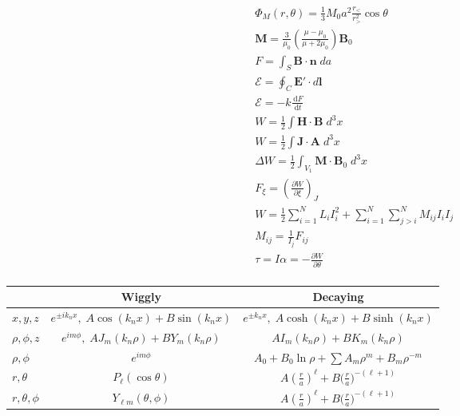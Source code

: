 \documentclass[10pt]{article}
\newcommand{\vect}[1]{\boldsymbol{\mathbf{#1}}}
\newcommand{\dd}{\, \mathrm{d}}
\newcommand{\tder}[2]{\frac{\dd #1}{\dd #2}}
\newcommand{\pder}[2]{\frac{\partial #1}{\partial #2}}
\begin{document}
\begin{multicols}{2}
\begin{align*}
		& \Phi_M(r,\theta) = \frac{1}{3} M_0 a^2 \frac{r_<}{r_>^2} \cos \theta \tag*{Uniformly magnetized sphere (5.104)} \\
		& \vect{M} = \frac{3}{\mu_0} \left( \frac{\mu - \mu_0}{\mu + 2 \mu_0} \right) \vect{B}_0 \tag*{Sphere in uniform field (5.115)} \\
		& F = \int_S \vect{B \cdot n} \; da \tag*{Magnetic flux (5.133)} \\
		& \mathscr{E} = \oint_C \vect{E}' \cdot d \vect{l} \tag*{Electromotive force (5.134)} \\
		& \mathscr{E} = -k \tder{F}{t} \tag*{Faraday's Law (5.135)} \\
		& W = \frac{1}{2} \int \vect{H \cdot B} \; d^3 x \tag*{Total magnetic energy (5.148)} \\
		& W = \frac{1}{2} \int \vect{J \cdot A} \; d^3 x \tag*{Energy in terms of potential (5.149)} \\
		& \Delta W = \frac{1}{2} \int_{V_1} \vect{M \cdot B}_0 \; d^3 x \tag*{Change in energy for placing object (5.150)} \\
		& F_\xi = \left( \pder{W}{\xi} \right)_J \tag*{Generalized force (5.151)} \\
		& W = \frac{1}{2} \sum_{i=1}^N L_i I_i^2 + \sum_{i=1}^N \sum_{j>i}^N M_{ij} I_i I_j \tag*{Inductive energy (5.152)} \\
		& M_{ij} = \frac{1}{I_j} F_{ij} \tag*{Mutual inductance (5.156)} \\
		& \tau = I \alpha = - \pder{W}{\theta} \tag*{Mechanical torque}\\
 	\end{align*}
	\renewcommand{\arraystretch}{2}
	\begin{tabular}{| l | c | c |} \hline
		& Wiggly & Decaying \\ \hline
		$x,y,z$ &$ e^{\pm i k_n x}, \; A \cos(k_n x) + B\sin(k_n x)$ & $e^{\pm k_n x}, \; A \cosh( k_n x) + B \sinh(k_n x)$ \\ \hline
		$\rho,\phi,z$ & $e^{i m \phi}, \; A J_m(k_n \rho) + B Y_m(k_n \rho)$ & $ A I_m(k_n \rho) + B K_m(k_n \rho)$ \\ \hline
		$\rho,\phi$ & $e^{i m \phi}$ & $A_0 + B_0 \ln \rho + \sum A_m \rho^m + B_m \rho^{-m}$ \\ \hline
		$r,\theta$ & $P_\ell(\cos \theta)$ & $A \left( \frac{r}{a} \right)^\ell + B \big( \frac{r}{a} \big)^{-(\ell+1)} $ \\ \hline
		$r, \theta, \phi$ & $Y_{\ell m}(\theta, \phi)$ &  $A \left( \frac{r}{a} \right)^\ell + B \big( \frac{r}{a} \big)^{-(\ell+1)} $ \\ \hline
	\end{tabular}
\end{multicols}
 
\end{document}

